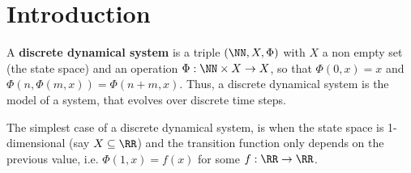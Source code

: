 \section{Introduction}
  \begin{definition}
    A \textbf{discrete dynamical system} is a triple $(\NN,X,\Phi)$ with $X$ a non empty set (the state space) and an operation $\Phi : \NN \times X \to X$, so that
    $\Phi(0,x) = x$ and $\Phi(n,\Phi(m,x)) = \Phi(n+m, x)$. 
    Thus, a discrete dynamical system is the model of a system, that evolves over discrete time steps.
  \end{definition}
  The simplest case of a discrete dynamical system, is when the state space is 1-dimensional (say $X \subseteq \RR$) and 
  the transition function only depends on the previous value, i.e. $\Phi(1,x) = f(x)$ for some $f : \RR \to \RR$. 

